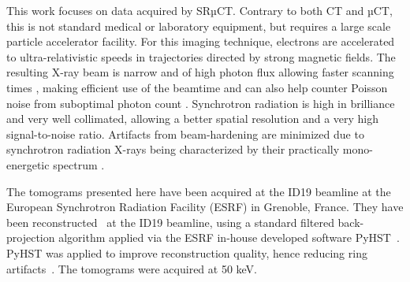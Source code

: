 This work focuses on data acquired by SRµCT.  Contrary to both CT and µCT, this
is not standard medical or laboratory equipment, but requires a large scale
particle accelerator facility.  For this imaging technique, electrons are
accelerated to ultra-relativistic speeds in trajectories directed by strong
magnetic fields. The resulting X-ray beam is narrow and of high photon flux
allowing faster scanning times \cite{srexptime}, making efficient use of the
beamtime and can also help counter Poisson noise from suboptimal photon count
\cite{srnoise}. Synchrotron radiation is high in brilliance and very well
collimated, allowing a better spatial resolution and a very high signal-to-noise
ratio.  Artifacts from beam-hardening are minimized due to synchrotron radiation
X-rays being characterized by their practically mono-energetic spectrum
\cite{srbeamquality}.

The tomograms presented here have been acquired at the ID19 beamline at the
European Synchrotron Radiation Facility (ESRF) in Grenoble, France. They have
been reconstructed~\cite{sporring} at the ID19 beamline, using a standard
filtered back-projection algorithm applied via the ESRF in-house developed
software PyHST~\cite{NELDAM2015682,pyhst}. PyHST was applied to improve
reconstruction quality, hence reducing ring artifacts~\cite{MIRONE201441}. The
tomograms were acquired at 50 keV.

